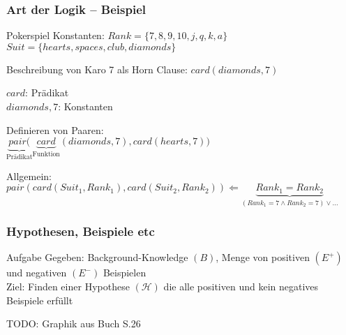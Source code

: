 \begin{frame}
	\frametitle{Art der Logik -- Beispiel}

	\begin{block}{Pokerspiel}
	Konstanten: $Rank = \{7,8,9,10,j,q,k,a\}$\\
	            $Suit = \{hearts, spaces, club, diamonds\}$
	
	Beschreibung von Karo 7 als Horn Clause: $card(diamonds, 7)$

	$card$: Prädikat\\
	$diamonds, 7$: Konstanten

	Definieren von Paaren:\\
	$\underbrace{pair(}_{\text{Prädikat}}\underbrace{card}_{\text{Funktion}}(diamonds, 7),
	card(hearts, 7))$

	Allgemein:\\
	$pair(card(Suit_1, Rank_1),card(Suit_2, Rank_2)) \Leftarrow \underbrace{Rank_1 =
	Rank_2}_{(Rank_1=7 \wedge Rank_2=7) \vee \ldots}$

	\end{block}
	
\end{frame}

\begin{frame}
\frametitle{Hypothesen, Beispiele etc}
\begin{block}{Aufgabe}
	Gegeben: Background-Knowledge $(B)$, Menge von positiven $(E^+)$ und negativen $(E^-)$ Beispielen\\
	Ziel: Finden einer Hypothese $(\mathcal{H})$ die alle positiven und kein negatives Beispiele erfüllt

TODO: Graphik aus Buch S.26
\end{block}
\end{frame}
